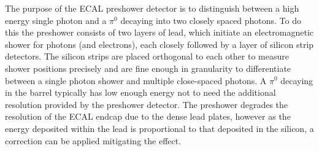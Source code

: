 The purpose of the ECAL preshower detector is to distinguish between a high energy single photon and a $\pi^{0}$ decaying into two closely spaced photons.
To do this the preshower consists of two layers of lead, which initiate an electromagnetic shower for photons (and electrons), each closely followed by a layer of silicon strip detectors. 
The silicon strips are placed orthogonal to each other to measure shower positions precisely and are fine enough in granularity to differentiate between a single photon shower and multiple close-spaced photons.
A $\pi^{0}$ decaying in the barrel typically has low enough energy not to need the additional resolution provided by the preshower detector. 
The preshower degrades the resolution of the ECAL endcap due to the dense lead plates, however as the energy deposited within the lead is proportional to that deposited in the silicon, a correction can be applied mitigating the effect.

